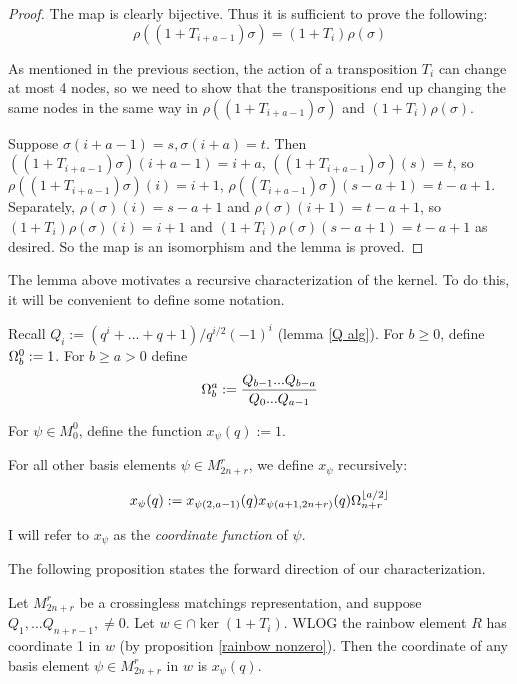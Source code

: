 \documentclass{amsart}
\begin{document}
 \begin{proof}
 	
 	The map is clearly bijective. Thus it is sufficient to prove the following: $$\rho((1+T_{i+a-1})\sigma)=(1+T_i)\rho(\sigma)$$
 	
 	As mentioned in the previous section, the action of a transposition $T_i$ can change at most 4 nodes, so we need to show that the transpositions end up changing the same nodes in the same way in  $\rho((1+T_{i+a-1})\sigma)$ and $(1+T_i)\rho(\sigma)$.
 	
 	Suppose $\sigma(i+a-1)=s,\sigma(i+a)=t$. Then $((1+T_{i+a-1})\sigma)(i+a-1)=i+a$, $((1+T_{i+a-1})\sigma)(s)=t$, so $\rho((1+T_{i+a-1})\sigma)(i)=i+1$, $\rho((T_{i+a-1})\sigma)(s-a+1)=t-a+1$. Separately, $\rho(\sigma)(i)=s-a+1$ and $\rho(\sigma)(i+1)=t-a+1$, so $(1+T_i)\rho(\sigma)(i)=i+1$ and $(1+T_i)\rho(\sigma)(s-a+1)=t-a+1$ as desired. So the map is an isomorphism and the lemma is proved.
 \end{proof}
 
 \vspace{5mm}
 The lemma above motivates a recursive characterization of the kernel. To do this, it will be convenient to define some notation.
 
 \begin{definition}
 	Recall $Q_i:=(q^i+...+q+1)/q^{i/2}(-1)^i$ (lemma \ref{Q alg}). For $b\geq 0$, define $\Omega^0_b:=1$. For $b\geq a>0$ define $$\Omega_b^a:=\frac{Q_{b-1}...Q_{b-a}}{Q_0...Q_{a-1}}$$
 	
 \end{definition}
 
 \begin{definition}
 	For $\psi \in M_0^0$, define the function $x_\psi(q):=1$.
 	
 	For all other basis elements $\psi\in M_{2n+r}^r$, we define $x_\psi$ recursively:
 	
 	$$x_\psi(q):=x_{\psi(2,a-1)}(q)x_{\psi(a+1,2n+r)}(q)\Omega^{\lfloor a/2\rfloor}_{n+r}$$
 	
 	I will refer to $x_\psi$ as the \emph{coordinate function} of $\psi$.
 	
 	\label{coeff def}
 \end{definition}
 
 
 \vspace{2mm}
 The following proposition states the forward direction of our characterization.
 \begin{proposition}
 	
 	Let $M_{2n+r}^r$ be a crossingless matchings representation, and suppose $Q_1,...Q_{n+r-1},\not=0$. Let $w\in\cap\ker(1+T_i)$. WLOG the rainbow element $R$ has coordinate 1 in $w$ (by proposition \ref{rainbow nonzero}). Then the coordinate of any basis element $\psi\in M_{2n+r}^r$ in $w$ is $x_{\psi}(q)$.
 	
 	\label{kernel characterization}
 	
 \end{proposition}
 
\end{document}
